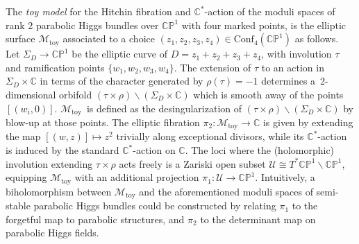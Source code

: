 \documentclass[pdftex]{sigma}
\newcommand{\field}[1]{\ensuremath{\mathbb{#1}}}
\newcommand{\CC}{\field{C}}
\newcommand{\PP}{\field{P}}
\newcommand{\curly}[1]{\mathscr{#1}}
\newcommand{\cM}{\curly{M}}
\newcommand{\cU}{\curly{U}}
\numberwithin{equation}{section}
\begin{document}
The \textit{toy model} \cite{Hau98} for the Hitchin fibration and $\CC^{*}$-action of the moduli spaces of rank 2 parabolic Higgs bundles over $\CC\PP^{1}$ with four marked points, is the elliptic surface $\cM_{\mathrm{toy}}$ associated to a choice $(z_{1},z_{2},z_{3},z_{4})\in\mathrm{Conf}_{4}(\CC\PP^{1})$ as follows. Let $\Sigma_{D}\rightarrow \CC\PP^{1}$ be the elliptic curve of $D=z_{1}+z_{2}+z_{3}+z_{4}$, with involution $\tau$ and ramification points $\{w_{1},w_{2},w_{3},w_{4}\}$. The extension of $\tau$ to an action in $\Sigma_{D}\times \CC$ in terms of the character generated by $\rho(\tau) = -1$ determines a~2-dimensional orbifold $(\tau\times\rho) \backslash (\Sigma_{D}\times \CC)$ which is smooth away of the points $[(w_{i},0)]$. $\cM_{\mathrm{toy}}$~is defined as the desingularization of $(\tau\times\rho) \backslash (\Sigma_{D}\times \CC)$ by blow-up at those points. The elliptic fibration $\pi_{2}\colon\cM_{\mathrm{toy}}\rightarrow \CC$ is given by extending the map $[(w,z)]\mapsto z^{2}$ trivially along exceptional divisors, while its $\CC^{*}$-action is induced by the standard $\CC^{*}$-action on $\CC$. The loci where the (holomorphic) involution extending $\tau\times\rho$ acts freely is a Zariski open subset $\cU\cong T^{*}\CC\PP^{1}\backslash\CC\PP^{1}$, equipping $\cM_{\mathrm{toy}}$ with an additional projection $\pi_{1}\colon \cU\rightarrow\CC\PP^{1}$. Intuitively, a biholomorphism between $\cM_{\mathrm{toy}}$ and the aforementioned moduli spaces of semi-stable parabolic Higgs bundles could be constructed by relating $\pi_{1}$ to the forgetful map to parabolic structures, and $\pi_{2}$ to the determinant map on parabolic Higgs fields.
\end{document}
